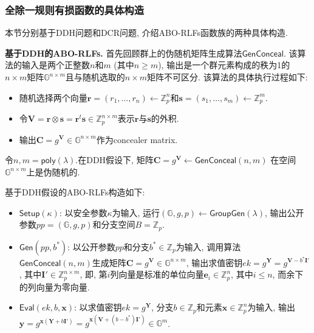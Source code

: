 \subsubsection{全除一规则有损函数的具体构造}
本节分别基于DDH问题和DCR问题, 介绍ABO-RLFs函数族的两种具体构造. 

\medskip\noindent\textbf{基于DDH的ABO-RLFs.} 首先回顾群上的伪随机矩阵生成算法$\mathsf{GenConceal}$. 该算法的输入是两个正整数$n$和$m$ (其中$n \geq m$), 输出是一个群元素构成的秩为1的$n \times m$矩阵$\mathbb{G}^{n \times m}$且与随机选取的$n \times m$矩阵不可区分. 该算法的具体执行过程如下: 
\begin{itemize} \itemsep 1pt \parskip 0pt \parsep 0pt
	\item 随机选择两个向量$\mathbf{r} = (r_1, \dots, r_n) \leftarrow \mathbb{Z}_p^n$和$\mathbf{s} = (s_1, \dots, s_m) \leftarrow \mathbb{Z}_p^{m}$. 

	\item 令$\mathbf{V} = \mathbf{r} \otimes \mathbf{s} = \mathbf{r}^t\mathbf{s} \in \mathbb{Z}_p^{n \times m}$表示$\mathbf{r}$与$\mathbf{s}$的外积. 

	\item 输出$\mathbf{C} = g^\mathbf{V} \in \mathbb{G}^{n \times m}$作为concealer matrix.   
\end{itemize} 

\begin{lemma}[\cite{PW2008}]
令$n, m = \mathsf{poly}(\lambda)$.在DDH假设下, 矩阵$\mathbf{C} = g^\mathbf{V} \leftarrow \mathsf{GenConceal}(n, m)$ 在空间$\mathbb{G}^{n \times m}$上是伪随机的.   
\end{lemma}

基于DDH假设的ABO-RLFs构造如下:
\begin{construction}\label{construction:DDH-ABO-RLFs}  
\begin{itemize} \itemsep 1pt \parskip 0pt \parsep 0pt
\item $\mathsf{Setup}(\kappa)$: 以安全参数$\kappa$为输入, 运行$(\mathbb{G}, g, p) \leftarrow \mathsf{GroupGen}(\lambda)$, 
	输出公开参数$pp = (\mathbb{G}, g, p)$和分支空间$B = \mathbb{Z}_p$.  

\item $\mathsf{Gen}(pp, b^*)$: 以公开参数$pp$和分支$b^* \in \mathbb{Z}_p$为输入, 
调用算法$\mathsf{GenConceal}(n, m)$生成矩阵$\mathbf{C} = g^\mathbf{V} \in \mathbb{G}^{n \times m}$, 
	输出求值密钥$ek = g^\mathbf{Y} = g^{\mathbf{V} - b^* \mathbf{I}'}$, 
	其中$\mathbf{I}' \in \mathbb{Z}_p^{n \times m}$, 即, 第$i$列向量是标准的单位向量$\mathbf{e}_i \in \mathbb{Z}_p^n$, 其中$i \leq n$, 而余下的列向量为零向量. 

\item $\mathsf{Eval}(ek, b, \mathbf{x})$: 以求值密钥$ek = g^\mathbf{Y}$, 
分支$b \in \mathbb{Z}_p$和元素$\mathbf{x} \in \mathbb{Z}_p^n$为输入, 
	输出$\mathbf{y} = g^{\mathbf{x}(\mathbf{Y}+b\mathbf{I}')} = g^{\mathbf{x}(\mathbf{V}+(b-b^*)\mathbf{I}')} 
	\in \mathbb{G}^{m}$.    
\end{itemize}
\end{construction}

